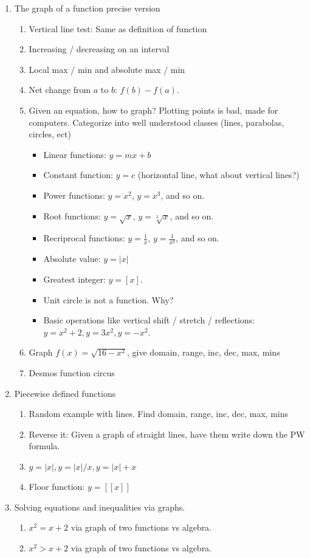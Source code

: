 \documentclass{article}
\begin{document}
\begin{enumerate}
\item The graph of a function precise version 
\begin{enumerate}
\item Vertical line test: Same as definition of function
\item Increasing / decreasing on an interval
\item Local max / min and absolute max / min
\item Net change from $a$ to $b$: $f(b)-f(a)$.
\item Given an equation, how to graph? Plotting points is bad, made for computers. Categorize into well understood classes (lines, parabolas, circles, ect)
\begin{itemize}
\item Linear functions: $y = mx+b$
\item Constant function: $y = c$ (horizontal line, what about vertical lines?)
\item Power functions: $y=x^2$, $y=x^3$, and so on.
\item Root functions: $y=\sqrt{x}$, $y=\sqrt[3]{x}$, and so on.
\item Recriprocal functions: $y = \frac{1}{x}$, $y = \frac{1}{x^2}$, and so on.
\item Absolute value: $y=|x|$
\item Greatest integer: $y=[x]$.
\item Unit circle is not a function. Why?
\item Basic operations like vertical shift / stretch / reflections: $y=x^2+2, y=3x^2, y=-x^2$.
\end{itemize}
\item Graph $f(x)=\sqrt{16-x^2}$, give domain, range, inc, dec, max, mins 
\item Desmos function circus
\end{enumerate}


\item Piecewise defined functions
\begin{enumerate}
\item Random example with lines. Find domain, range, inc, dec, max, mins 
\item Reverse it: Given a graph of straight lines, have them write down the PW formula.
\item $y = |x|, y = |x|/x, y = |x|+x$
\item Floor function: $y = [[x]]$
\end{enumerate}

\item Solving equations and inequalities via graphs.
\begin{enumerate}
\item $x^2 = x+2$ via graph of two functions vs algebra.
\item $x^2 > x+2$ via graph of two functions vs algebra.
\end{enumerate}
\end{enumerate}
\end{document}
